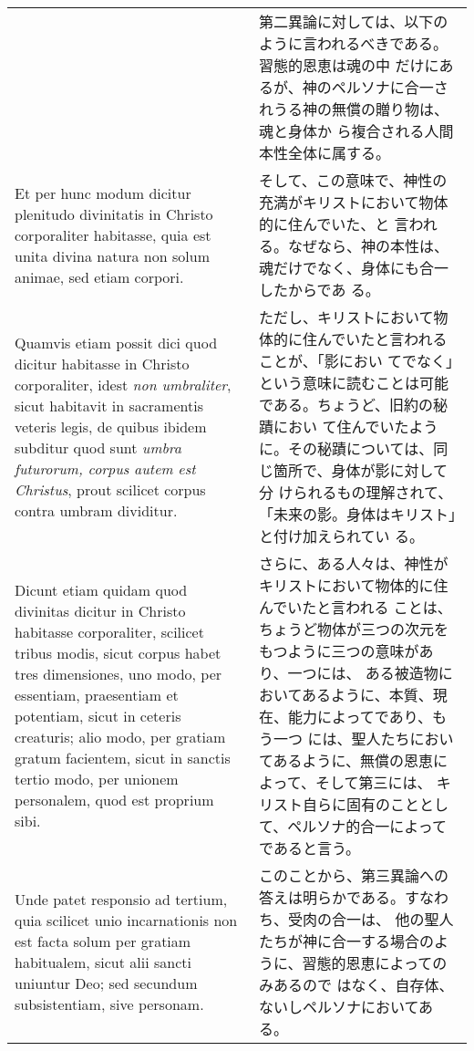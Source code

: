 \documentclass[10pt]{jsarticle} %
\begin{document}
\begin{longtable}{p{21em}p{21em}}
&

第二異論に対しては、以下のように言われるべきである。習態的恩恵は魂の中
だけにあるが、神のペルソナに合一されうる神の無償の贈り物は、魂と身体か
ら複合される人間本性全体に属する。


\\

Et per hunc modum dicitur plenitudo divinitatis in Christo
corporaliter habitasse, quia est unita divina natura non solum animae,
sed etiam corpori.

&

そして、この意味で、神性の充満がキリストにおいて物体的に住んでいた、と
言われる。なぜなら、神の本性は、魂だけでなく、身体にも合一したからであ
る。


\\

Quamvis etiam possit dici quod dicitur habitasse in Christo
corporaliter, idest {\itshape non umbraliter}, sicut habitavit in
sacramentis veteris legis, de quibus ibidem subditur quod sunt
{\itshape umbra futurorum, corpus autem est Christus}, prout scilicet
corpus contra umbram dividitur.

&

ただし、キリストにおいて物体的に住んでいたと言われることが、「影におい
てでなく」という意味に読むことは可能である。ちょうど、旧約の秘蹟におい
て住んでいたように。その秘蹟については、同じ箇所で、身体が影に対して分
けられるもの理解されて、「未来の影。身体はキリスト」と付け加えられてい
る。


\\

Dicunt etiam quidam quod divinitas dicitur in Christo habitasse
corporaliter, scilicet tribus modis, sicut corpus habet tres
dimensiones, uno modo, per essentiam, praesentiam et potentiam, sicut
in ceteris creaturis; alio modo, per gratiam gratum facientem, sicut
in sanctis tertio modo, per unionem personalem, quod est proprium
sibi.

&

さらに、ある人々は、神性がキリストにおいて物体的に住んでいたと言われる
ことは、ちょうど物体が三つの次元をもつように三つの意味があり、一つには、
ある被造物においてあるように、本質、現在、能力によってであり、もう一つ
には、聖人たちにおいてあるように、無償の恩恵によって、そして第三には、
キリスト自らに固有のこととして、ペルソナ的合一によってであると言う。

\\



Unde patet responsio ad tertium, quia scilicet unio incarnationis non
est facta solum per gratiam habitualem, sicut alii sancti uniuntur
Deo; sed secundum subsistentiam, sive personam.

&

このことから、第三異論への答えは明らかである。すなわち、受肉の合一は、
他の聖人たちが神に合一する場合のように、習態的恩恵によってのみあるので
はなく、自存体、ないしペルソナにおいてある。

\end{longtable}
\newpage
\end{document}
